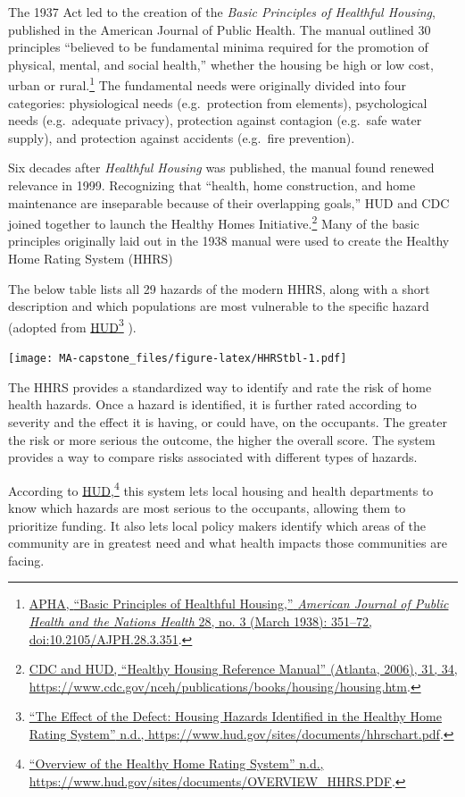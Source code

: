 \documentclass[
  openany]{book}
\begin{document}
The 1937 Act led to the creation of the \emph{Basic Principles of Healthful Housing}, published in the American Journal of Public Health. The manual outlined 30 principles ``believed to be fundamental minima required for the promotion of physical, mental, and social health,'' whether the housing be high or low cost, urban or rural.\footnote{\protect\hyperlink{ref-apha1938}{APHA, {``Basic Principles of Healthful Housing,''} \emph{American Journal of Public Health and the Nations Health} 28, no. 3 (March 1938): 351--72, doi:\href{https://doi.org/10.2105/AJPH.28.3.351}{10.2105/AJPH.28.3.351}}.} The fundamental needs were originally divided into four categories: physiological needs (e.g.~protection from elements), psychological needs (e.g.~adequate privacy), protection against contagion (e.g.~safe water supply), and protection against accidents (e.g.~fire prevention).

Six decades after \emph{Healthful Housing} was published, the manual found renewed relevance in 1999. Recognizing that ``health, home construction, and home maintenance are inseparable because of their overlapping goals,'' HUD and CDC joined together to launch the Healthy Homes Initiative.\footnote{\protect\hyperlink{ref-cdc2006}{CDC and HUD, {``Healthy Housing Reference Manual''} (Atlanta, 2006), 31, 34, \url{https://www.cdc.gov/nceh/publications/books/housing/housing.htm}}.} Many of the basic principles originally laid out in the 1938 manual were used to create the Healthy Home Rating System (HHRS)

The below table lists all 29 hazards of the modern HHRS, along with a short description and which populations are most vulnerable to the specific hazard (adopted from \protect\hyperlink{ref-HHRSlst}{HUD}\footnote{\protect\hyperlink{ref-HHRSlst}{{``The Effect of the Defect: Housing Hazards Identified in the Healthy Home Rating System''} n.d., \url{https://www.hud.gov/sites/documents/hhrschart.pdf}}.} ).

\texttt{[image: MA-capstone\_files/figure-latex/HHRStbl-1.pdf]}

The HHRS provides a standardized way to identify and rate the risk of home health hazards. Once a hazard is identified, it is further rated according to severity and the effect it is having, or could have, on the occupants. The greater the risk or more serious the outcome, the higher the overall score. The system provides a way to compare risks associated with different types of hazards.

According to \protect\hyperlink{ref-HHRSover}{HUD},\footnote{\protect\hyperlink{ref-HHRSover}{{``Overview of the Healthy Home Rating System''} n.d., \url{https://www.hud.gov/sites/documents/OVERVIEW_HHRS.PDF}}.} this system lets local housing and health departments to know which hazards are most serious to the occupants, allowing them to prioritize funding. It also lets local policy makers identify which areas of the community are in greatest need and what health impacts those communities are facing.
\end{document}
